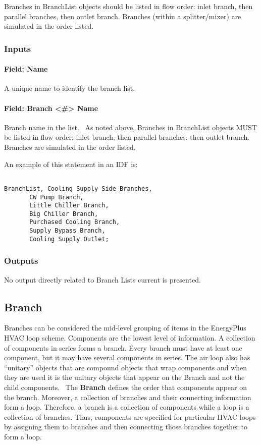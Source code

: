 Branches in BranchList objects should be listed in flow order: inlet branch, then parallel branches, then outlet branch. Branches (within a splitter/mixer) are simulated in the order listed.

\subsubsection{Inputs}\label{inputs-1-025}

\paragraph{Field: Name}\label{field-name-1-024}

A unique name to identify the branch list.

\paragraph{Field: Branch \textless{}\#\textgreater{} Name}\label{field-branch-name}

Branch name in the list.~ As noted above, Branches in BranchList objects MUST be listed in flow order: inlet branch, then parallel branches, then outlet branch. Branches are simulated in the order listed.

An example of this statement in an IDF is:

\begin{lstlisting}

BranchList, Cooling Supply Side Branches,
       CW Pump Branch,
       Little Chiller Branch,
       Big Chiller Branch,
       Purchased Cooling Branch,
       Supply Bypass Branch,
       Cooling Supply Outlet;
\end{lstlisting}

\subsubsection{Outputs}\label{outputs-1-016}

No output directly related to Branch Lists current is presented.

\subsection{Branch}\label{branch}

Branches can be considered the mid-level grouping of items in the EnergyPlus HVAC loop scheme. Components are the lowest level of information. A collection of components in series forms a branch. Every branch must have at least one component, but it may have several components in series. The air loop also has ``unitary'' objects that are compound objects that wrap components and when they are used it is the unitary objects that appear on the Branch and not the child components.~ The \textbf{Branch} defines the order that components appear on the branch. Moreover, a collection of branches and their connecting information form a loop. Therefore, a branch is a collection of components while a loop is a collection of branches. Thus, components are specified for particular HVAC loops by assigning them to branches and then connecting those branches together to form a loop.

